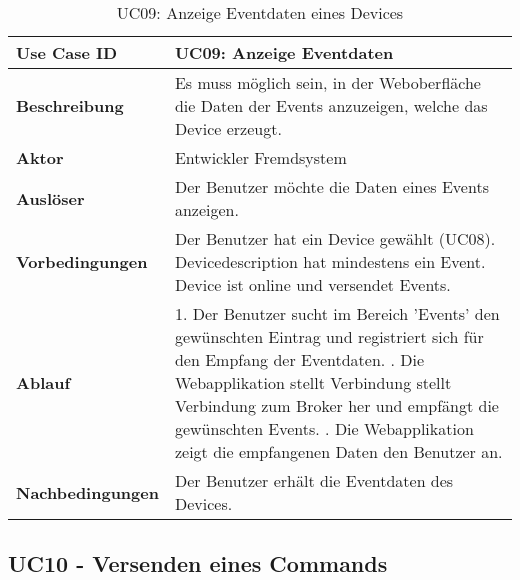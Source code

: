\begin{table}[H]
\begin{tabularx}{\textwidth}{|l|X|}

 \hline
 {\bf Use Case ID }    & UC09: Anzeige Eventdaten \\  \hline
 {\bf Beschreibung }   & Es muss möglich sein, in der Weboberfläche die Daten der Events anzuzeigen, welche das Device erzeugt. \\ \hline
 {\bf Aktor }          & Entwickler Fremdsystem \\ \hline
 {\bf Auslöser }       & Der Benutzer möchte die Daten eines Events anzeigen. \\ \hline
 {\bf Vorbedingungen } & 
     Der Benutzer hat ein Device gewählt (UC08). \newline
     Devicedescription hat mindestens ein Event. \newline 
     Device ist online und versendet Events. \\ \hline
 {\bf Ablauf }         & 
     1. Der Benutzer sucht im Bereich 'Events' den gewünschten Eintrag und registriert sich für den Empfang der Eventdaten. \newline
     2. Die Webapplikation stellt Verbindung stellt Verbindung zum Broker her und empfängt die gewünschten Events. \newline
     3. Die Webapplikation zeigt die empfangenen Daten den Benutzer an. \\ \hline
 {\bf Nachbedingungen} & Der Benutzer erhält die Eventdaten des Devices. \\ \hline
  
\end{tabularx}
\caption{UC09: Anzeige Eventdaten eines Devices}
\end{table}

\subsection{UC10 - Versenden eines Commands}

